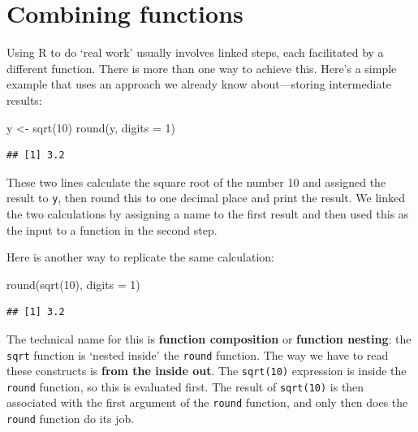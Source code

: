 \documentclass[
]{book}
\newenvironment{Shaded}{\begin{snugshade}}{\end{snugshade}}
\newcommand{\AttributeTok}[1]{\textcolor[rgb]{0.77,0.63,0.00}{#1}}
\newcommand{\DecValTok}[1]{\textcolor[rgb]{0.00,0.00,0.81}{#1}}
\newcommand{\FunctionTok}[1]{\textcolor[rgb]{0.00,0.00,0.00}{#1}}
\newcommand{\NormalTok}[1]{#1}
\newcommand{\OtherTok}[1]{\textcolor[rgb]{0.56,0.35,0.01}{#1}}
\begin{document}
\hypertarget{combining-functions}{%
\section{Combining functions}\label{combining-functions}}

Using R to do `real work' usually involves linked steps, each facilitated by a different function. There is more than one way to achieve this. Here's a simple example that uses an approach we already know about---storing intermediate results:

\begin{Shaded}
\begin{Highlighting}[]
\NormalTok{y }\OtherTok{\textless{}{-}} \FunctionTok{sqrt}\NormalTok{(}\DecValTok{10}\NormalTok{)}
\FunctionTok{round}\NormalTok{(y, }\AttributeTok{digits =} \DecValTok{1}\NormalTok{)}
\end{Highlighting}
\end{Shaded}

\begin{verbatim}
## [1] 3.2
\end{verbatim}

These two lines calculate the square root of the number 10 and assigned the result to \texttt{y}, then round this to one decimal place and print the result. We linked the two calculations by assigning a name to the first result and then used this as the input to a function in the second step.

Here is another way to replicate the same calculation:

\begin{Shaded}
\begin{Highlighting}[]
\FunctionTok{round}\NormalTok{(}\FunctionTok{sqrt}\NormalTok{(}\DecValTok{10}\NormalTok{), }\AttributeTok{digits =} \DecValTok{1}\NormalTok{)}
\end{Highlighting}
\end{Shaded}

\begin{verbatim}
## [1] 3.2
\end{verbatim}

The technical name for this is \textbf{function composition} or \textbf{function nesting}: the \texttt{sqrt} function is `nested inside' the \texttt{round} function. The way we have to read these constructs is \textbf{from the inside out}. The \texttt{sqrt(10)} expression is inside the \texttt{round} function, so this is evaluated first. The result of \texttt{sqrt(10)} is then associated with the first argument of the \texttt{round} function, and only then does the \texttt{round} function do its job.
\end{document}
